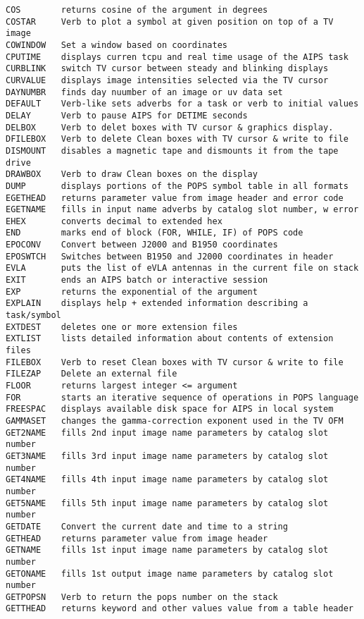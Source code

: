 \begin{verbatim}
COS        returns cosine of the argument in degrees
COSTAR     Verb to plot a symbol at given position on top of a TV image
COWINDOW   Set a window based on coordinates
CPUTIME    displays curren tcpu and real time usage of the AIPS task
CURBLINK   switch TV cursor between steady and blinking displays
CURVALUE   displays image intensities selected via the TV cursor
DAYNUMBR   finds day nuumber of an image or uv data set
DEFAULT    Verb-like sets adverbs for a task or verb to initial values
DELAY      Verb to pause AIPS for DETIME seconds
DELBOX     Verb to delet boxes with TV cursor & graphics display.
DFILEBOX   Verb to delete Clean boxes with TV cursor & write to file
DISMOUNT   disables a magnetic tape and dismounts it from the tape drive
DRAWBOX    Verb to draw Clean boxes on the display
DUMP       displays portions of the POPS symbol table in all formats
EGETHEAD   returns parameter value from image header and error code
EGETNAME   fills in input name adverbs by catalog slot number, w error
EHEX       converts decimal to extended hex
END        marks end of block (FOR, WHILE, IF) of POPS code
EPOCONV    Convert between J2000 and B1950 coordinates
EPOSWTCH   Switches between B1950 and J2000 coordinates in header
EVLA       puts the list of eVLA antennas in the current file on stack
EXIT       ends an AIPS batch or interactive session
EXP        returns the exponential of the argument
EXPLAIN    displays help + extended information describing a task/symbol
EXTDEST    deletes one or more extension files
EXTLIST    lists detailed information about contents of extension files
FILEBOX    Verb to reset Clean boxes with TV cursor & write to file
FILEZAP    Delete an external file
FLOOR      returns largest integer <= argument
FOR        starts an iterative sequence of operations in POPS language
FREESPAC   displays available disk space for AIPS in local system
GAMMASET   changes the gamma-correction exponent used in the TV OFM
GET2NAME   fills 2nd input image name parameters by catalog slot number
GET3NAME   fills 3rd input image name parameters by catalog slot number
GET4NAME   fills 4th input image name parameters by catalog slot number
GET5NAME   fills 5th input image name parameters by catalog slot number
GETDATE    Convert the current date and time to a string
GETHEAD    returns parameter value from image header
GETNAME    fills 1st input image name parameters by catalog slot number
GETONAME   fills 1st output image name parameters by catalog slot number
GETPOPSN   Verb to return the pops number on the stack
GETTHEAD   returns keyword and other values value from a table header

\end{verbatim}
